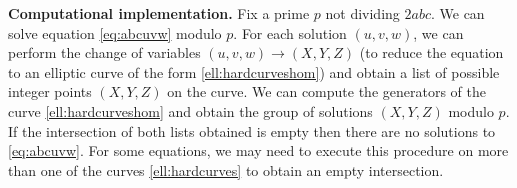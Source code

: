 \documentclass[a4paper,12pt,english,reqno]{amsart}
\begin{document}

\textbf{Computational implementation.}
Fix a prime $p$ not dividing $2abc$. We can solve equation \eqref{eq:abcuvw} modulo $p$. For each solution $(u,v,w)$, we can perform the change of variables $(u, v, w) \to (X, Y, Z)$ (to reduce the equation to an elliptic curve of the form \eqref{ell:hardcurveshom}) and obtain a list of possible integer points $(X,Y,Z)$ on the curve. We can compute the generators of the curve \eqref{ell:hardcurveshom} and obtain the group of solutions $(X,Y,Z)$ modulo $p$. If the intersection of both lists obtained is empty then there are no solutions to \eqref{eq:abcuvw}. For some equations, we may need to execute this procedure on more than one of the curves \eqref{ell:hardcurves} to obtain an empty intersection.
\end{document}
